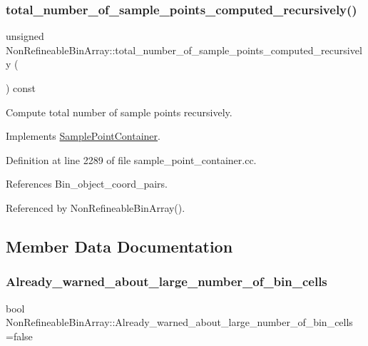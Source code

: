 \subsubsection{\texorpdfstring{total\+\_\+number\+\_\+of\+\_\+sample\+\_\+points\+\_\+computed\+\_\+recursively()}{total\_number\_of\_sample\_points\_computed\_recursively()}}
{\footnotesize\ttfamily unsigned Non\+Refineable\+Bin\+Array\+::total\+\_\+number\+\_\+of\+\_\+sample\+\_\+points\+\_\+computed\+\_\+recursively (\begin{DoxyParamCaption}{ }\end{DoxyParamCaption}) const\hspace{0.3cm}{\ttfamily [virtual]}}



Compute total number of sample points recursively. 



Implements \hyperlink{classSamplePointContainer_ac7bf51a6987a9180c7715d6211fdbb46}{Sample\+Point\+Container}.



Definition at line 2289 of file sample\+\_\+point\+\_\+container.\+cc.



References Bin\+\_\+object\+\_\+coord\+\_\+pairs.



Referenced by Non\+Refineable\+Bin\+Array().



\subsection{Member Data Documentation}
\mbox{\label{classNonRefineableBinArray_a9f65e36e36025d0060040bf5109dcc24}} 
\subsubsection{\texorpdfstring{Already\+\_\+warned\+\_\+about\+\_\+large\+\_\+number\+\_\+of\+\_\+bin\+\_\+cells}{Already\_warned\_about\_large\_number\_of\_bin\_cells}}
{\footnotesize\ttfamily bool Non\+Refineable\+Bin\+Array\+::\+Already\+\_\+warned\+\_\+about\+\_\+large\+\_\+number\+\_\+of\+\_\+bin\+\_\+cells =false\hspace{0.3cm}{\ttfamily [static]}}




